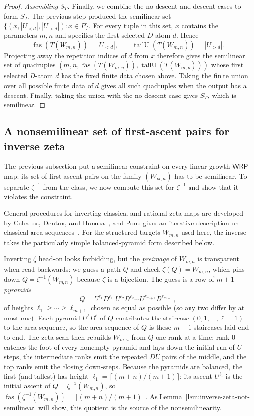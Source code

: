 \documentclass[11pt]{article}
\theoremstyle{definition}
\newcommand{\WRP}{\mathsf{WRP}}
\newcommand{\fas}{\operatorname{fas}}
\newcommand{\tailU}{\operatorname{tailU}}
\begin{document}
\begin{proof}
\vspace{0.5em}
\noindent\emph{Assembling $S_T$.}  Finally, we combine the no-descent and
descent cases to form $S_T$.  The previous step produced the semilinear set
$\{(x,|U_{<d}|,|U_{>d}|):x\in P\}$.  For every tuple in this set, $x$
contains the parameters $m,n$ and specifies the first selected $D$-atom $d$.
Hence
\[
   \fas(T(W_{m,n}))=|U_{<d}|,\qquad
   \tailU(T(W_{m,n}))=|U_{>d}|.
\]
Projecting away the repetition indices of $d$ from $x$ therefore gives the
semilinear set of quadruples
$(m,n,\fas(T(W_{m,n})),\tailU(T(W_{m,n})))$ whose first selected $D$-atom $d$ has
the fixed finite data chosen above.  Taking the finite union over all possible
finite data of $d$ gives all such quadruples when the output has a descent.
Finally, taking the union with the no-descent case gives $S_T$, which is
semilinear.
\end{proof}

\subsection{A nonsemilinear set of first-ascent pairs for inverse zeta}

The previous subsection put a semilinear constraint on every linear-growth
$\WRP$ map: its set of first-ascent pairs on the family $(W_{m,n})$ has to be
semilinear.  To separate $\zeta^{-1}$ from the class, we now compute this set
for $\zeta^{-1}$ and show that it violates the constraint.

General procedures for inverting classical and rational zeta maps are
developed by Ceballos, Denton, and Hanusa~\cite{CeballosDentonHanusa2016}, and
Pons gives an iterative description on classical area
sequences~\cite{Pons2022}.  For the structured targets $W_{m,n}$ used here,
the inverse takes the particularly simple balanced-pyramid form described
below.

Inverting $\zeta$ head-on looks forbidding, but the \emph{preimage} of $W_{m,n}$
is transparent when read backwards: we guess a path $Q$ and check
$\zeta(Q)=W_{m,n}$, which pins down $Q=\zeta^{-1}(W_{m,n})$ because $\zeta$ is a
bijection.  The guess is a row of $m+1$ \emph{pyramids}
\[
   Q=U^{\ell_1}D^{\ell_1}\;U^{\ell_2}D^{\ell_2}\cdots U^{\ell_{m+1}}D^{\ell_{m+1}},
\]
of heights $\ell_1\ge\cdots\ge\ell_{m+1}$ chosen as equal as possible (so any two
differ by at most one).  Each pyramid $U^{\ell}D^{\ell}$ of $Q$ contributes the
staircase $(0,1,\ldots,\ell-1)$ to the area sequence, so the area sequence of $Q$
is these $m+1$ staircases laid end to end.  The zeta scan then rebuilds $W_{m,n}$
from $Q$ one rank at a time: rank $0$ catches the foot of every nonempty
pyramid and lays down the initial run of $U$-steps, the intermediate ranks emit
the repeated $DU$ pairs of the middle, and the top ranks emit the closing
down-steps.  Because the pyramids
are balanced, the first (and tallest) has height
$\ell_1=\lceil(m+n)/(m+1)\rceil$; its ascent $U^{\ell_1}$ is the initial ascent of
$Q=\zeta^{-1}(W_{m,n})$, so $\fas(\zeta^{-1}(W_{m,n}))=\lceil(m+n)/(m+1)\rceil$.
As Lemma~\ref{lem:inverse-zeta-not-semilinear} will show, this quotient is the
source of the nonsemilinearity.
\end{document}
